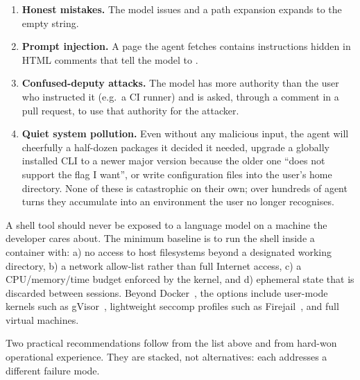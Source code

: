 \begin{enumerate}[label=(\arabic*)]
\item \textbf{Honest mistakes.} The model issues
   and a path expansion expands  to
  the empty string.
\item \textbf{Prompt injection.} A page the agent fetches contains
  instructions hidden in HTML comments that tell the model to
  .
\item \textbf{Confused-deputy attacks.} The model has more authority
  than the user who instructed it (e.g.\ a CI runner) and is asked,
  through a comment in a pull request, to use that authority for
  the attacker.
\item \textbf{Quiet system pollution.} Even without any malicious
  input, the agent will cheerfully  a half-dozen
  packages it decided it needed, upgrade a globally installed CLI to
  a newer major version because the older one ``does not support
  the flag I want'', or write configuration files into the user's
  home directory. None of these is catastrophic on their own; over
  hundreds of agent turns they accumulate into an environment the
  user no longer recognises.
\end{enumerate}

\begin{warningbox}
\small
A shell tool should never be exposed to a language model on a
machine the developer cares about. The minimum baseline is to run
the shell inside a container with: a) no access to host
filesystems beyond a designated working directory, b) a network
allow-list rather than full Internet access, c) a CPU/memory/time
budget enforced by the kernel, and d) ephemeral state that is
discarded between sessions. Beyond Docker~\citep{docker2013}, the
options include user-mode kernels such as
gVisor~\citep{gvisor2018}, lightweight seccomp profiles such as
Firejail~\citep{firejail}, and full virtual machines.
\end{warningbox}

\noindent
Two practical recommendations follow from the list above and from
hard-won operational experience. They are stacked, not alternatives:
each addresses a different failure mode.

